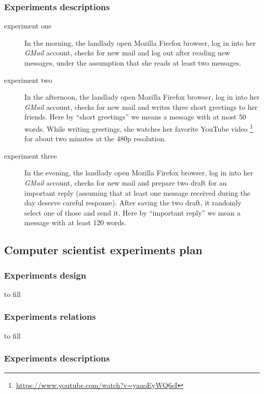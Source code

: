 \documentclass[10pt,a4paper]{article}
\begin{document}
    \subsubsection*{Experiments descriptions}
    
    \begin{description}
    \item[experiment one] In the morning, the landlady open Mozilla
      Firefox browser, log in into her \emph{GMail} account, checks for
      new mail and log out after reading new messages, under the
      assumption that she reads at least two messages.
    \item[experiment two] In the afternoon, the landlady open Mozilla
      Firefox browser, log in into her \emph{GMail} account, checks
      for new mail and writes three short greetings to her
      friends. Here by ``short greetings'' we means a message with at
      most 50 words.  While writing greetings, she watches her
      favorite YouTube video
      \footnote{\url{https://www.youtube.com/watch?v=yaaoEyWQ6eI}} for
      about two minutes at the 480p resolution.
    \item[experiment three] In the evening, the landlady open Mozilla
      Firefox browser, log in into her \emph{GMail} account, checks for
      new mail and prepare two draft for an important reply (assuming
      that at least one message received during the day deserve
      careful response). After saving the two draft, it randomly
      select one of those and send it. Here by ``important reply'' we
      mean a message with at least 120 words.
    \end{description}

    \newpage
    \subsection{Computer scientist experiments plan}

    \subsubsection*{Experiments design }
    to fill

    \subsubsection*{Experiments relations}
    to fill

    \subsubsection*{Experiments descriptions}
    
\end{document}
